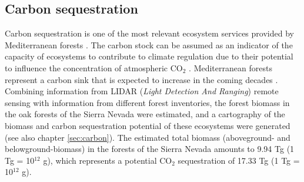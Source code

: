 \subsection{Carbon sequestration}\label{sec:es:regulation-carbon}
Carbon sequestration is one of the most relevant ecosystem services provided by Mediterranean forests \autocites{Gauquelinetal2018MediterraneanForests,NoceSantini2018MediterraneanForest}. The carbon stock can be assumed as an indicator of the capacity of ecosystems to contribute to climate regulation due to their potential to influence the concentration of atmospheric CO$_2$ \autocites{Lauterbach2007AssessmentExisting,Luyssaertetal2008OldgrowthForests}. Mediterranean forests represent a carbon sink that is expected to increase in the coming decades \autocites{Canellasetal2017CarbonSequestration,PasalodosTatoetal2017EvaluationTree}.
Combining information from LIDAR (\emph{Light Detection And Ranging}) remote sensing with information from different forest inventories, the forest biomass in the oak forests of the Sierra Nevada were estimated, and a cartography of the biomass and carbon sequestration potential of these ecosystems were generated \autocites{PerezLuqueetal2021CarbonSequestration} (see also chapter \ref{sec:carbon}). The estimated total biomass (aboveground- and belowground-biomass) in the \Qp forests of the Sierra Nevada amounts to 9.94 Tg (1 Tg = 10$^12$ g), which represents a potential CO$_2$ sequestration of 17.33 Tg (1 Tg = 10$^12$ g).

